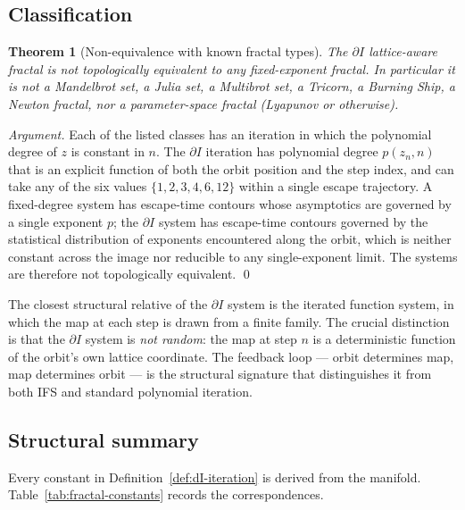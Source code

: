 \documentclass[11pt,a4paper]{article}
\newtheorem{theorem}{Theorem}[section]
\theoremstyle{definition}
\theoremstyle{remark}
\begin{document}
\subsection{Classification}

\begin{theorem}[Non-equivalence with known fractal types]\label{thm:dI-novel}
The $\partial I$ lattice-aware fractal is not topologically equivalent to any fixed-exponent fractal. In particular it is not a Mandelbrot set, a Julia set, a Multibrot set, a Tricorn, a Burning Ship, a Newton fractal, nor a parameter-space fractal (Lyapunov or otherwise).
\end{theorem}

\begin{proof}[Argument]
Each of the listed classes has an iteration in which the polynomial degree of $z$ is constant in $n$. The $\partial I$ iteration has polynomial degree $p(z_{n},n)$ that is an explicit function of both the orbit position and the step index, and can take any of the six values $\{1,2,3,4,6,12\}$ within a single escape trajectory. A fixed-degree system has escape-time contours whose asymptotics are governed by a single exponent $p$; the $\partial I$ system has escape-time contours governed by the statistical distribution of exponents encountered along the orbit, which is neither constant across the image nor reducible to any single-exponent limit. The systems are therefore not topologically equivalent. \qed
\end{proof}

The closest structural relative of the $\partial I$ system is the iterated function system, in which the map at each step is drawn from a finite family. The crucial distinction is that the $\partial I$ system is \emph{not random}: the map at step $n$ is a deterministic function of the orbit's own lattice coordinate. The feedback loop --- orbit determines map, map determines orbit --- is the structural signature that distinguishes it from both IFS and standard polynomial iteration.

\subsection{Structural summary}

Every constant in Definition~\ref{def:dI-iteration} is derived from the manifold. Table~\ref{tab:fractal-constants} records the correspondences.
\end{document}
